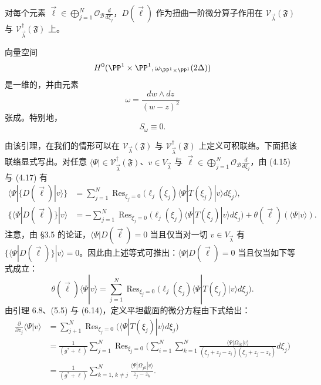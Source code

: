 \begin{corollary}[6.7]
对每个元素 $\vec\ell\in\bigoplus_{j=1}^{N}\mathcal{O}_{\mathcal{B}}\frac{d}{d\xi_j}$，$D(\vec\ell)$ 作为扭曲一阶微分算子作用在 $\mathcal{V}_{\vec\lambda}(\mathfrak{F})$ 与 $\mathcal{V}^{\dagger}_{\vec\lambda}(\mathfrak{F})$ 上。
\end{corollary}
\begin{lemma}[6.8]
向量空间
\[
H^0(\PP^1\times\PP^1,\omega_{\PP^1\times\PP^1}(2\Delta))
\]
是一维的，并由元素
\begin{equation}
\omega=\frac{dw\wedge dz}{(w-z)^2}\tag{6.19}
\end{equation}
张成。特别地，
\[
S_\omega\equiv0.
\]
\end{lemma}
由该引理，在我们的情形可以在 $\mathcal{V}_{\vec\lambda}(\mathfrak{F})$ 与 $\mathcal{V}^{\dagger}_{\vec\lambda}(\mathfrak{F})$ 上定义可积联络。下面把该联络显式写出。对任意 $\langle\Psi|\in\mathcal{V}^{\dagger}_{\vec\lambda}(\mathfrak{F})$、$v\in V_{\vec\lambda}$ 与 $\vec\ell\in\bigoplus_{j=1}^{N}\mathcal{O}_{\mathcal{B}}\frac{d}{d\xi_j}$，由 (4.15) 与 (4.17) 有
\begin{align*}
\langle\Psi|\{D(\vec\ell)|v\rangle\}&=\sum_{j=1}^{N}\operatorname{Res}_{\xi_j=0}\big(\ell_j(\xi_j)\langle\Psi|T(\xi_j)|v\rangle d\xi_j\big),\\
\{\langle\Psi|D(\vec\ell)\}|v\rangle&=-\sum_{j=1}^{N}\operatorname{Res}_{\xi_j=0}\big(\ell_j(\xi_j)\langle\Psi|T(\xi_j)|v\rangle d\xi_j\big)+\theta(\vec\ell)(\langle\Psi|v\rangle).
\end{align*}
注意，由 §3.5 的论证，$\langle\Psi|D(\vec\ell)=0$ 当且仅当对一切 $v\in V_{\vec\lambda}$ 有 $\{\langle\Psi|D(\vec\ell)\}|v\rangle=0$。因此由上述等式可推出：$\langle\Psi|D(\vec\ell)=0$ 当且仅当如下等式成立：
\[
\theta(\vec\ell)\langle\Psi|v\rangle=\sum_{j=1}^{N}\operatorname{Res}_{\xi_j=0}\big(\ell_j(\xi_j)\langle\Psi|T(\xi_j)|v\rangle d\xi_j\big).
\]
由引理 6.8、(5.5) 与 (6.14)，定义平坦截面的微分方程由下式给出：
\begin{align*}
\frac{\partial}{\partial z_j}\langle\Psi|v\rangle&=\sum_{j+1}^{N}\operatorname{Res}_{\xi_j=0}\big(\langle\Psi|T(\xi_j)|v\rangle d\xi_j\big)\\
&=\frac{1}{(g^*+\ell)}\sum_{j=1}^{N}\operatorname{Res}_{\xi_j=0}\Big(\sum_{i=1}^{N}\sum_{k=1}^{N}\frac{\langle\Psi|\Omega_{ik}|v\rangle}{(\xi_j+z_j-z_i)(\xi_j+z_j-z_k)}d\xi_j\Big)\\
&=\frac{1}{(g^*+\ell)}\sum_{k=1,\,k\ne j}^{N}\frac{\langle\Psi|\Omega_{jk}|v\rangle}{z_j-z_k}.
\end{align*}
